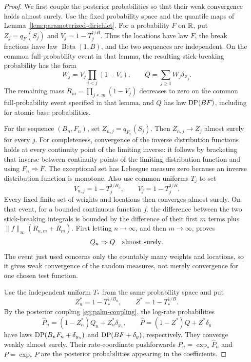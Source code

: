 \begin{proof}
We first couple the posterior probabilities so that their weak convergence holds almost surely.
Use the fixed probability space and the quantile maps of Lemma~\ref{lem:parameterized-dirichlet}.
For a probability \(F\) on \(\mathbb R\), put \(Z_j=q_F(S_j)\) and \(V_j=1-T_j^{1/B}\).
Thus the locations have law \(F\), the break fractions have law \(\operatorname{Beta}(1,B)\), and the two sequences are independent.
On the common full-probability event in that lemma, the resulting stick-breaking probability has the form
\begin{equation}
 W_j=V_j\prod_{i<j}(1-V_i),
 \qquad
 Q=\sum_{j\ge1}W_j\delta_{Z_j}.
 \label{eq:evolution-stick-breaking}
\end{equation}
The remaining mass \(R_m=\prod_{j\le m}(1-V_j)\) decreases to zero on the common full-probability event specified in that lemma, and \(Q\) has law \(\operatorname{DP}(BF)\), including for atomic base probabilities.

For the sequence \((B_n,F_n)\), set \(Z_{n,j}=q_{F_n}(S_j)\).
Then \(Z_{n,j}\to Z_j\) almost surely for every \(j\).
For completeness, convergence of the inverse distribution functions holds at every continuity point of the limiting inverse: it follows by bracketing that inverse between continuity points of the limiting distribution function and using \(F_n\Rightarrow F\).
The exceptional set has Lebesgue measure zero because an inverse distribution function is monotone.
Also use common uniforms \(T_j\) to set
\[
 V_{n,j}=1-T_j^{1/B_n},
 \qquad V_j=1-T_j^{1/B}.
 \]
Every fixed finite set of weights and locations then converges almost surely.
On that event, for a bounded continuous function \(f\), the difference between the two stick-breaking integrals is bounded by the difference of their first \(m\) terms plus \(\|f\|_\infty(R_{n,m}+R_m)\).
First letting \(n\to\infty\), and then \(m\to\infty\), proves
\[
 Q_n\Rightarrow Q\quad\hbox{almost surely}.
 \]
The event just used concerns only the countably many weights and locations, so it gives weak convergence of the random measures, not merely convergence for one chosen test function.

Use the independent uniform \(T_*\) from the same probability space and put
\[
 Z_n^*=1-T_*^{1/B_n},\qquad Z^*=1-T_*^{1/B}.
 \]
By the posterior coupling \eqref{eq:palm-coupling}, the log-rate probabilities
\[
 \widehat P_n=(1-Z_n^*)Q_n+Z_n^*\delta_{y_n},
 \qquad
 \widehat P=(1-Z^*)Q+Z^*\delta_y
 \]
have laws \(\operatorname{DP}(B_nF_n+\delta_{y_n})\) and \(\operatorname{DP}(BF+\delta_y)\), respectively.
They converge weakly almost surely.
Their rate-coordinate pushforwards \(P_n=\exp_*\widehat P_n\) and \(P=\exp_*\widehat P\) are the posterior probabilities appearing in the coefficients.


\end{proof}
